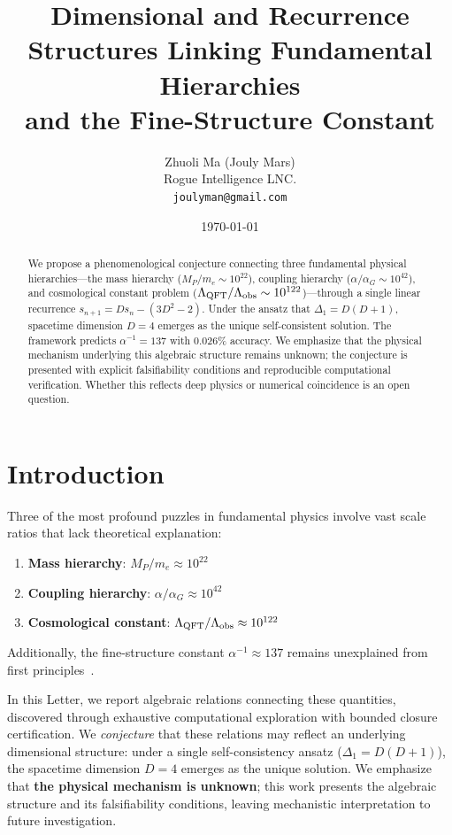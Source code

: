\documentclass[11pt,a4paper]{article}
\title{Dimensional and Recurrence Structures Linking Fundamental Hierarchies\\
and the Fine-Structure Constant}
\author{Zhuoli Ma (Jouly Mars)\\
\small Rogue Intelligence LNC.\\
\small \texttt{joulyman@gmail.com}}
\date{\today}
\begin{document}
\maketitle

\begin{abstract}
We propose a phenomenological conjecture connecting three fundamental 
physical hierarchies---the mass hierarchy ($M_P/m_e \sim 10^{22}$), coupling 
hierarchy ($\alpha/\alpha_G \sim 10^{42}$), and cosmological constant problem 
($\Lambda_{\rm QFT}/\Lambda_{\rm obs} \sim 10^{122}$)---through a single linear 
recurrence $s_{n+1} = Ds_n - (3D^2-2)$. Under the ansatz that 
$\Delta_1 = D(D+1)$, spacetime dimension $D = 4$ emerges as the unique 
self-consistent solution. The framework predicts $\alpha^{-1} = 137$ 
with 0.026\% accuracy. We emphasize that the physical mechanism underlying 
this algebraic structure remains unknown; the conjecture is presented with 
explicit falsifiability conditions and reproducible computational verification. 
Whether this reflects deep physics or numerical coincidence is an open question.
\end{abstract}


\section{Introduction}

Three of the most profound puzzles in fundamental physics involve vast scale 
ratios that lack theoretical explanation:

\begin{enumerate}
\item \textbf{Mass hierarchy}: $M_P/m_e \approx 10^{22}$
\item \textbf{Coupling hierarchy}: $\alpha/\alpha_G \approx 10^{42}$
\item \textbf{Cosmological constant}: $\Lambda_{\rm QFT}/\Lambda_{\rm obs} \approx 10^{122}$
\end{enumerate}

Additionally, the fine-structure constant $\alpha^{-1} \approx 137$ remains 
unexplained from first principles~\cite{feynman_qed}.

In this Letter, we report algebraic relations connecting these quantities, 
discovered through exhaustive computational exploration with bounded closure 
certification. We \emph{conjecture} that these relations may reflect an 
underlying dimensional structure: under a single self-consistency ansatz 
($\Delta_1 = D(D+1)$), the spacetime dimension $D = 4$ emerges as the unique 
solution. We emphasize that \textbf{the physical mechanism is unknown}; 
this work presents the algebraic structure and its falsifiability conditions, 
leaving mechanistic interpretation to future investigation.
\end{document}
